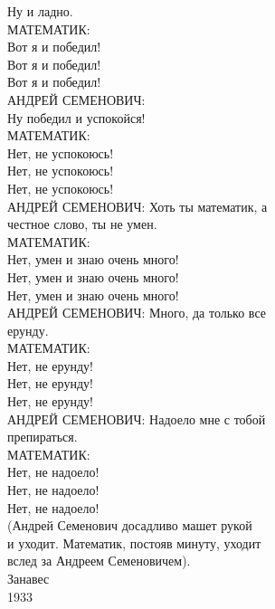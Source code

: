 	\hspace{1cm} Ну и ладно. \\
МАТЕМАТИК: \\
	\hspace{1cm} Вот я и победил! \\
	\hspace{1cm} Вот я и победил! \\
	\hspace{1cm} Вот я и победил! \\
АНДРЕЙ СЕМЕНОВИЧ: \\
	\hspace{1cm} Ну победил и успокойся! \\
МАТЕМАТИК: \\
	\hspace{1cm} Нет, не успокоюсь! \\
	\hspace{1cm} Нет, не успокоюсь! \\
	\hspace{1cm} Нет, не успокоюсь! \\
АНДРЕЙ СЕМЕНОВИЧ:  Хоть ты математик,  а \\
честное слово, ты не умен. \\
МАТЕМАТИК: \\
    \hspace{1cm}Нет, умен и знаю очень много! \\
    \hspace{1cm}Нет, умен и знаю очень много! \\
    \hspace{1cm}Нет, умен и знаю очень много! \\
АНДРЕЙ СЕМЕНОВИЧ:  Много,  да только все \\
ерунду. \\
МАТЕМАТИК: \\
	\hspace{1cm} Нет, не ерунду! \\
	\hspace{1cm} Нет, не ерунду! \\
	\hspace{1cm} Нет, не ерунду! \\
АНДРЕЙ СЕМЕНОВИЧ:  Надоело  мне с  тобой \\
препираться. \\
МАТЕМАТИК: \\
	\hspace{1cm} Нет, не надоело! \\
	\hspace{1cm} Нет, не надоело! \\
	\hspace{1cm} Нет, не надоело! \\
(Андрей Семенович досадливо машет  рукой \\
и уходит.  Математик, постояв минуту, уходит \\
вслед за Андреем Семеновичем). \\
		\hspace{2cm}Занавес \\
						\hspace{6cm}1933